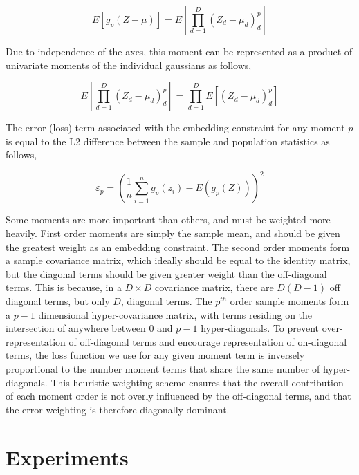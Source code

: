 \documentclass[10pt,twocolumn,letterpaper]{article}
\begin{document}
\begin{equation}
	E\left[g_p(Z - \mu)\right] = E\left[ \prod_{d=1}^D (Z_d - \mu_d)^p_d \right]
\end{equation}

Due to independence of the axes, this moment can be represented as a product of univariate moments of the individual gaussians as follows,

\begin{equation}
	E\left[ \prod_{d=1}^D (Z_d - \mu_d)^p_d \right] = \prod_{d=1}^D E\left[ (Z_d - \mu_d)^p_d \right]
\end{equation}

The error (loss) term associated with the embedding constraint for any moment $p$ is equal to the L2 difference between the sample and population statistics as follows,

\begin{equation}
	\varepsilon_p = \left( \frac{1}{n} \sum_{i=1}^n g_p(z_i) - E(g_p(Z)) \right)^2
\end{equation}

Some moments are more important than others, and must be weighted more heavily.  
First order moments are simply the sample mean, and should be given the greatest weight as an embedding constraint.  
The second order moments form a sample covariance matrix, which ideally should be equal to the identity matrix, but the diagonal terms should be given greater weight than the off-diagonal terms.  
This is because, in a $D \times D$ covariance matrix, there are $D(D-1)$ off diagonal terms, but only $D$, diagonal terms.  
The $p^{th}$ order sample moments form a $p-1$ dimensional hyper-covariance matrix, with terms residing on the intersection of anywhere between $0$ and $p-1$ hyper-diagonals.  
To prevent over-representation of off-diagonal terms and encourage representation of on-diagonal terms, the loss function we use for any given moment term is inversely proportional to the number moment terms that share the same number of hyper-diagonals.  
This heuristic weighting scheme ensures that the overall contribution of each moment order is not overly influenced by the off-diagonal terms, and that the error weighting is therefore diagonally dominant.

\section{Experiments}
\end{document}
